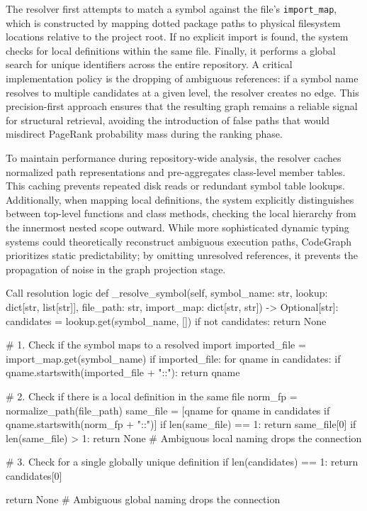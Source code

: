 The resolver first attempts to match a symbol against the file's \texttt{import\_map}, which is constructed by mapping dotted package paths to physical filesystem locations relative to the project root. If no explicit import is found, the system checks for local definitions within the same file. Finally, it performs a global search for unique identifiers across the entire repository. A critical implementation policy is the dropping of ambiguous references: if a symbol name resolves to multiple candidates at a given level, the resolver creates no edge. This precision-first approach ensures that the resulting graph remains a reliable signal for structural retrieval, avoiding the introduction of false paths that would misdirect PageRank probability mass during the ranking phase.

To maintain performance during repository-wide analysis, the resolver caches normalized path representations and pre-aggregates class-level member tables. This caching prevents repeated disk reads or redundant symbol table lookups. Additionally, when mapping local definitions, the system explicitly distinguishes between top-level functions and class methods, checking the local hierarchy from the innermost nested scope outward. While more sophisticated dynamic typing systems could theoretically reconstruct ambiguous execution paths, CodeGraph prioritizes static predictability; by omitting unresolved references, it prevents the propagation of noise in the graph projection stage.

\begin{cgpython}[label=lst:call-resolution, unbreakable]{Call resolution logic}
def _resolve_symbol(self, symbol_name: str, lookup: dict[str, list[str]], file_path: str, import_map: dict[str, str]) -> Optional[str]:
    candidates = lookup.get(symbol_name, [])
    if not candidates:
        return None
        
    # 1. Check if the symbol maps to a resolved import
    imported_file = import_map.get(symbol_name)
    if imported_file:
        for qname in candidates:
            if qname.startswith(imported_file + "::"):
                return qname
                
    # 2. Check if there is a local definition in the same file
    norm_fp = normalize_path(file_path)
    same_file = [qname for qname in candidates if qname.startswith(norm_fp + "::")]
    if len(same_file) == 1:
        return same_file[0]
    if len(same_file) > 1:
        return None  # Ambiguous local naming drops the connection
        
    # 3. Check for a single globally unique definition
    if len(candidates) == 1:
        return candidates[0]
        
    return None  # Ambiguous global naming drops the connection
\end{cgpython}

